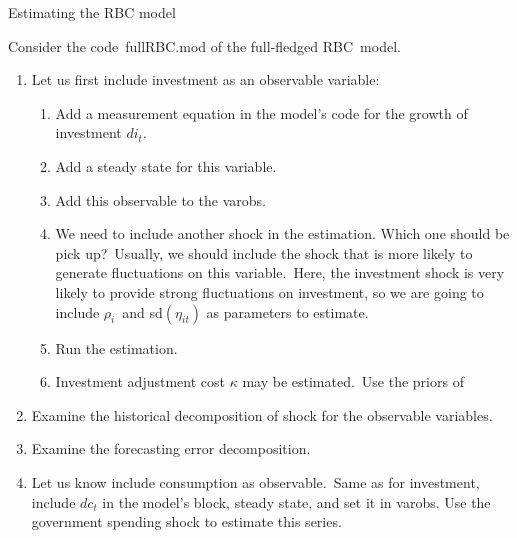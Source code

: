 \documentclass[a4paper,12pt]{article}%
\begin{document}
\newpage%

\begin{myexercise}{Estimating the RBC model}
%


Consider the code\ \textsf{fullRBC.mod} of the full-fledged RBC\ model.

\begin{enumerate}
\item Let us first include investment as an observable variable:

\begin{enumerate}
\item Add a measurement equation in the model's code for the growth of
investment $di_{t}.$

\item Add a steady state for this variable.

\item Add this observable to the \textsf{varobs}.

\item We need to include another shock in the estimation. Which one should be
pick up?\ Usually, we should include the shock that is more likely to generate
fluctuations on this variable.\ Here, the investment shock is very likely to
provide strong fluctuations on investment, so we are going to include
$\rho_{i}$\ and sd$\left(  \eta_{it}\right)  $ as parameters to estimate.

\item Run the estimation.

\item Investment adjustment cost $\kappa$ may be estimated.\ Use the priors of
\cite{smets2007shocks}
\end{enumerate}

\item Examine the historical decomposition of shock for the observable variables.

\item Examine the forecasting error decomposition.

\item Let us know include consumption as observable.\ Same as for investment,
include $dc_{t}$ in the model's block, steady state, and set it in
\textsf{varobs}. Use the government spending shock to estimate this series.


\end{enumerate}
\end{myexercise}
\end{document}
